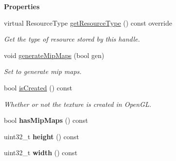 \begin{Indent}\textbf{ Properties}\par
\begin{DoxyCompactItemize}
\item 
\mbox{\label{classrev_1_1_texture_a879821f7ed1d75d12f008e3f62ffa98e}} 
virtual Resource\+Type \mbox{\hyperlink{classrev_1_1_texture_a879821f7ed1d75d12f008e3f62ffa98e}{get\+Resource\+Type}} () const override
\begin{DoxyCompactList}\small\item\em Get the type of resource stored by this handle. \end{DoxyCompactList}\item 
\mbox{\label{classrev_1_1_texture_aa908bdb779ed8ccf35b54ad15dff23fa}} 
void \mbox{\hyperlink{classrev_1_1_texture_aa908bdb779ed8ccf35b54ad15dff23fa}{generate\+Mip\+Maps}} (bool gen)
\begin{DoxyCompactList}\small\item\em Set to generate mip maps. \end{DoxyCompactList}\item 
\mbox{\label{classrev_1_1_texture_a45232a3c367d1a03a8affcc68db9643f}} 
bool \mbox{\hyperlink{classrev_1_1_texture_a45232a3c367d1a03a8affcc68db9643f}{is\+Created}} () const
\begin{DoxyCompactList}\small\item\em Whether or not the texture is created in Open\+GL. \end{DoxyCompactList}\item 
\mbox{\label{classrev_1_1_texture_ae4201927485626f9e7b6fbb989ce869f}} 
bool {\bfseries has\+Mip\+Maps} () const
\item 
\mbox{\label{classrev_1_1_texture_a15eddb8a87e8d7edfd4770001476994d}} 
uint32\+\_\+t {\bfseries height} () const
\item 
\mbox{\label{classrev_1_1_texture_aa66e2944cf29b24888bc36a795fc2497}} 
uint32\+\_\+t {\bfseries width} () const
\item 
\mbox{\label{classrev_1_1_texture_a7a03d22f7e3a4a357222197c6782bdf2}} 

\end{DoxyCompactItemize}
\end{Indent}
